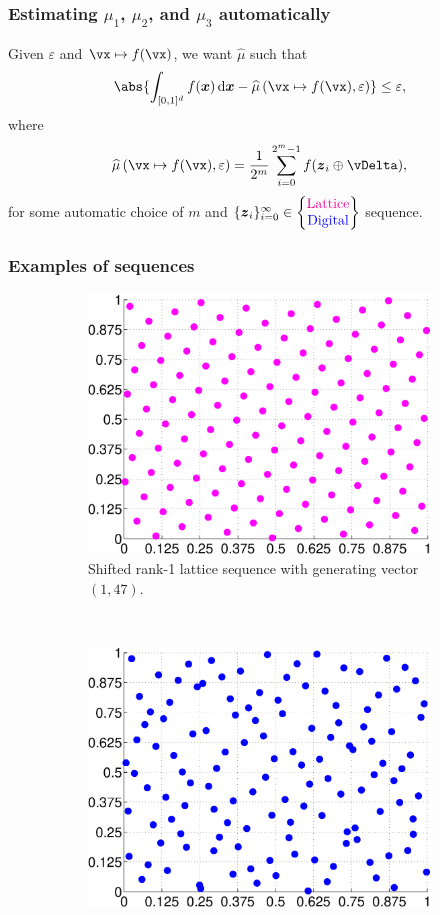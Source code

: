 \documentclass[11pt,compress]{beamer} %
\newcommand{\bsz}{\boldsymbol{z}}    %
\newcommand{\bsx}{\boldsymbol{x}}    %
\newcommand{\D}{{\rm d}}
\newcommand{\intalg}{\widehat{\mu}\left(\vx\mapsto f(\vx),\varepsilon\right)}
\begin{document}
\begin{frame}
\frametitle{Estimating $\mu_1$, $\mu_2$, and $\mu_3$ automatically}
Given $\varepsilon$ and $\vx\mapsto f(\vx)$, we want $\widehat{\mu}$ such that
\[
\abs{\int_{[0,1]^d} f(\bsx)\,\D\bsx - \intalg}\leq \varepsilon,
\]
where
\[
\intalg = \frac{1}{2^m} \sum_{i=0}^{2^m-1} f(\bsz_i\oplus\vDelta),
\]
for some \alert{automatic} choice of $m$ and $\{\bsz_i\}_{i=0}^{\infty}
\in\begin{Bmatrix}\textcolor{magenta}{\text{Lattice}}\\\textcolor{blue}{\text{Digital}}\end{Bmatrix}$ sequence.%
\end{frame}

\begin{frame}
\frametitle{Examples of sequences}
\begin{figure}\centering
\begin{subfigure}[b]{0.45\textwidth}
\includegraphics[width=1.\textwidth]{Images/lat_seq.eps}
\caption*{Shifted rank-1 lattice sequence with generating vector $(1,47)$.}
\end{subfigure}
~ %
\begin{subfigure}[b]{0.45\textwidth}
\includegraphics[width=1.\textwidth]{Images/sob_seq.eps}

\end{subfigure}
\end{figure}
\end{frame}
\end{document}
